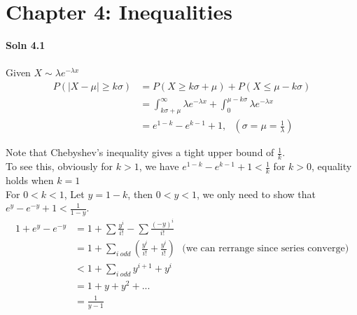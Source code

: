 \documentclass{article}
\newcommand{\SOL}[2]{%
  \textbf{Soln #1}\\%
}
\begin{document}
\section*{Chapter 4: Inequalities}
\SOL{4.1}
\\ \\
Given $X \sim \lambda e^{-\lambda x}$ \\
\begin{align*}
P(|X - \mu| \geq k\sigma) &= P(X \geq k\sigma + \mu) + P( X \leq \mu - k\sigma) \\
    &= \int_{k\sigma + \mu}^{\infty} \lambda e^{-\lambda x} + \int_{0}^{ \mu - k\sigma} \lambda e^{-\lambda x} \\
    &= e^{1-k} - e^{k-1} + 1, \ \ \ ( \sigma = \mu = \frac{1}{\lambda} )
\end{align*}

Note that Chebyshev's inequality gives a tight upper bound of $\frac{1}{k}$. \\ 
To see this, obviously for $k > 1$, we have $e^{1-k} - e^{k-1} + 1 < \frac{1}{k}$ for $k> 0$, equality holds when $k = 1$ \\
For $0 < k < 1$, Let $y = 1 - k$, then $ 0< y < 1$, we only need to show that $e^y - e^{-y} + 1 < \frac{1}{1- y}$. \\
\begin{align*}
   1 + e^y - e^{-y} &= 1 + \sum \frac{y^i}{i!} - \sum \frac{(-y)^i}{i!} \\
                   &= 1 +  \sum_{i\ odd} \left( \frac{y^{i}}{i!} + \frac{y^{i}}{i!} \right)\ \ \ \mbox{(we can rerrange since series converge)} \\
                   &< 1 + \sum_{i\ odd} y^{i+1} + y^{i} \\
                   &= 1 + y + y^2 + ... \\
                   &= \frac{1}{y-1}
\end{align*}
\end{document}
